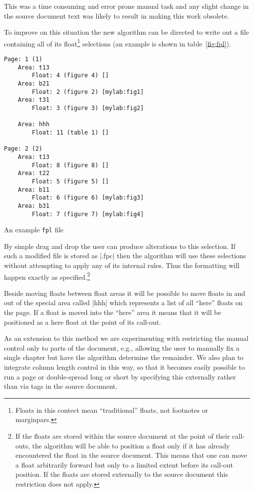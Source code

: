 \documentclass[twocolumn]{article}
\begin{document}
This was a time consuming and error prone manual task and any slight
change in the source document text was likely to result in making this
work obsolete.

To improve on this situation the new algorithm can be directed to
write out a file containing all of its float\footnote{Floats in this
contect mean ``traditional'' floats, not footnotes or marginpars.}
selections (an example is
shown in table~\vref{fig:fpl}).
%
\begin{table}
\begin{minipage}{\columnwidth-24pt}
\footnotesize
\begin{verbatim}
Page: 1 (1)
    Area: t13
        Float: 4 (figure 4) []
    Area: b21
        Float: 2 (figure 2) [mylab:fig1]
    Area: t31
        Float: 3 (figure 3) [mylab:fig2]

    Area: hhh
        Float: 11 (table 1) []

Page: 2 (2)
    Area: t13
        Float: 8 (figure 8) []
    Area: t22
        Float: 5 (figure 5) []
    Area: b11
        Float: 6 (figure 6) [mylab:fig3]
    Area: b31
        Float: 7 (figure 7) [mylab:fig4]
\end{verbatim}
\end{minipage}
\caption{An example \texttt{fpl} file}\label{fig:fpl}
\end{table}
%
By simple drag and drop the user can produce alterations to this
selection. If such a modified file is stored as |\jobname.fpc| then
the algorithm will use these selections without attempting to apply
any of its internal rules. Thus the formatting will happen exactly as
specified.\footnote{If the floats are stored within the source
document at the point of their call-outs, the algorithm will be able
to position a float only if it has already encountered the float in the
source document. This means that one can move a float arbitrarily
forward but only to a limited extent before its call-out position. If
the floats are stored externally to the source document this
restriction does not apply.}

Beside moving floats between float areas it will be possible to move
floats in and out of the special area called |hhh| which represents a
list of all ``here'' floats on the page. If a float is moved into the
``here'' area it means that it will be positioned as a here float at
the point of its call-out.


As an extension to this method we are experimenting with restricting
the manual control only to parts of the document, e.g., allowing the
user to manually fix a single chapter but have the algorithm determine
the remainder. We also plan to integrate column length control in this
way, so that it becomes easily possible to run a page or double-spread
long or short by specifying this externally rather than via tags in
the source document.
\end{document}
